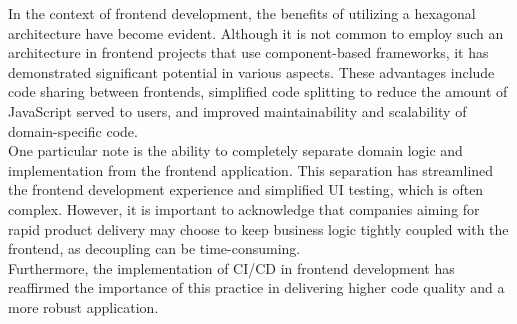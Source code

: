 \documentclass[../memory.tex]{subfiles}
\begin{document}
In the context of frontend development, the benefits of utilizing a hexagonal
architecture have become evident. Although it is not common to employ such an
architecture in frontend projects that use component-based frameworks, it has
demonstrated significant potential in various aspects. These advantages include
code sharing between frontends, simplified code splitting to reduce the amount
of JavaScript served to users, and improved maintainability and scalability of
domain-specific code.
\\
One particular note is the ability to completely separate domain logic and
implementation from the frontend application. This separation has streamlined
the frontend development experience and simplified UI testing, which is often
complex. However, it is important to acknowledge that companies aiming for rapid
product delivery may choose to keep business logic tightly coupled with the
frontend, as decoupling can be time-consuming.
\\[8pt]
Furthermore, the implementation of CI/CD in frontend development has reaffirmed
the importance of this practice in delivering higher code quality and a more
robust application.
\end{document}
